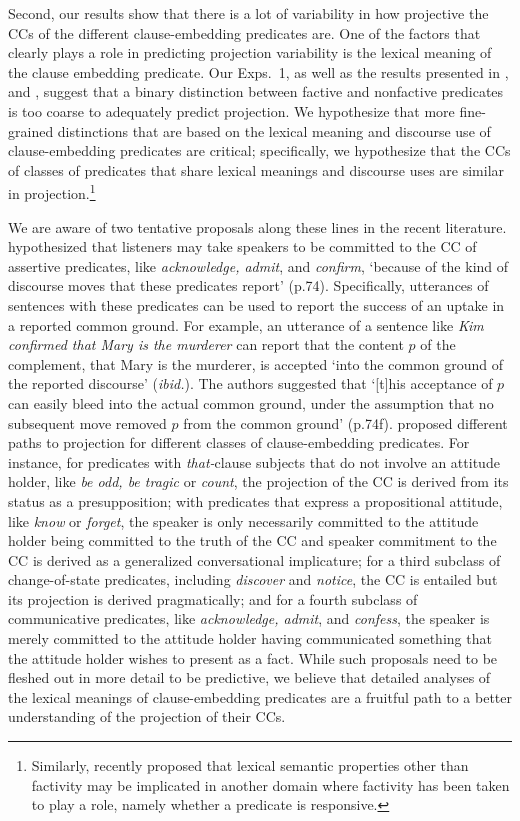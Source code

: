 \documentclass{language}
\newcommand{\6}{\mbox{$[\hspace*{-.6mm}[$}}
\newcommand{\9}{\mbox{$]\hspace*{-.6mm}]$}}
\begin{document}
Second, our results show that there is a lot of variability in how projective the CCs of the different clause-embedding predicates are. One of the factors that clearly plays a role in predicting projection variability is the lexical meaning of the clause embedding predicate. Our Exps.~1, as well as the results presented in \citealt{tbd-variability,demarneffe-etal-sub23}, and \citealt{degen-tonhauser-openmind}, suggest that a binary distinction between factive and nonfactive predicates is too coarse to adequately predict projection. We hypothesize that more fine-grained distinctions that are based on the lexical meaning and discourse use of clause-embedding predicates are critical; specifically, we hypothesize that the CCs of classes of predicates that share lexical meanings and discourse uses are similar in projection.\footnote{Similarly, \citealt{white2021} recently proposed that lexical semantic properties other than factivity may be implicated in another domain where factivity has been taken to play a role, namely whether a predicate is responsive.}
 

We are aware of two tentative proposals along these lines in the recent literature. \citet{anand-hacquard2014} hypothesized that listeners may take speakers to be committed to the CC of assertive predicates, like {\em acknowledge, admit}, and {\em confirm},  `because of the kind of discourse moves that these predicates report' (p.74). Specifically, utterances of sentences with these predicates can be used to report the success of an uptake in a reported common ground. For example, an utterance of a sentence like {\em Kim confirmed that Mary is the murderer} can report that the content $p$ of the  complement, that Mary is the murderer, is accepted `into the common ground of the reported discourse' ({\em ibid.}). The authors suggested that `[t]his acceptance of $p$ can easily bleed into the actual common ground, under the assumption that no subsequent move removed $p$ from the common ground' (p.74f). \citet{karttunen2016}  proposed different paths to projection for different classes of clause-embedding predicates. For instance, for predicates with {\em that-}clause subjects that do not involve an attitude holder, like {\em be odd, be tragic} or {\em count}, the projection of the CC is derived from its status as a presupposition; with predicates that express a propositional attitude, like {\em know} or {\em forget}, the speaker is only necessarily committed to the attitude holder being committed to the truth of the CC and speaker commitment to the CC is derived as a generalized conversational implicature; for a third subclass of change-of-state predicates, including {\em discover} and {\em notice}, the CC is entailed but its projection is derived pragmatically; and for a fourth subclass of communicative predicates, like {\em acknowledge, admit}, and {\em confess}, the speaker is merely committed to the attitude holder having communicated something that the attitude holder wishes to present as a fact. While such proposals need to be fleshed out in more detail to be predictive, we believe that detailed analyses of the lexical meanings of clause-embedding predicates are a fruitful path to a better understanding of the projection of their CCs.
\end{document}
